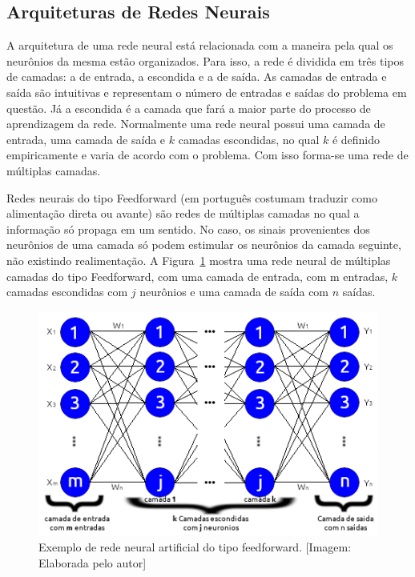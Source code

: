 \subsection{Arquiteturas de Redes Neurais}


A arquitetura de uma rede neural está relacionada com a maneira pela qual os neurônios da mesma estão organizados. Para isso, a rede é dividida em três tipos de camadas: a de entrada, a escondida e a de saída. As camadas de entrada e saída são intuitivas e representam o número de entradas e saídas do problema em questão. Já a escondida é a camada que fará a maior parte do processo de aprendizagem da rede. Normalmente uma rede neural possui uma camada de entrada, uma camada de saída e \(k\) camadas escondidas, no qual \(k\) é definido empiricamente e varia de acordo com o problema. Com isso forma-se uma rede de múltiplas camadas.

Redes neurais do tipo Feedforward (em português costumam traduzir como alimentação direta ou avante) são redes de múltiplas camadas no qual a informação só propaga em um sentido. No caso, os sinais provenientes dos neurônios de uma camada só podem estimular os neurônios da camada seguinte, não existindo realimentação. A Figura~\ref{figredeFeedforward} mostra uma rede neural de múltiplas camadas do tipo Feedforward, com uma camada de entrada, com m entradas, \(k\) camadas escondidas com \(j\) neurônios e uma camada de saída com \(n\) saídas.

\begin{figure}[ht]
\centering
\includegraphics[width=1\textwidth]{figuras/rede_neural_Feedforward.png}
\caption{Exemplo de rede neural artificial do tipo feedforward. [Imagem: Elaborada pelo autor]}
\label{figredeFeedforward}
\end{figure}

